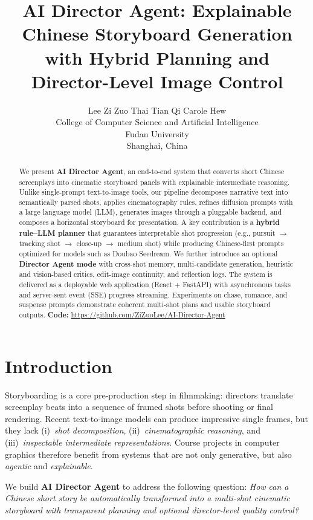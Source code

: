 \documentclass{article}
\title{AI Director Agent: Explainable Chinese Storyboard Generation\\[0.25em] with Hybrid Planning and Director-Level Image Control}
\author{Lee Zi Zuo \And Thai Tian Qi \And Carole Hew \\
College of Computer Science and Artificial Intelligence \\
Fudan University \\
Shanghai, China
}
\begin{document}
\maketitle

\begin{abstract}
We present \textbf{AI Director Agent}, an end-to-end system that converts short Chinese screenplays into cinematic storyboard panels with explainable intermediate reasoning.
Unlike single-prompt text-to-image tools, our pipeline decomposes narrative text into semantically parsed shots, applies cinematography rules, refines diffusion prompts with a large language model (LLM), generates images through a pluggable backend, and composes a horizontal storyboard for presentation.
A key contribution is a \textbf{hybrid rule--LLM planner} that guarantees interpretable shot progression (e.g., pursuit $\rightarrow$ tracking shot $\rightarrow$ close-up $\rightarrow$ medium shot) while producing Chinese-first prompts optimized for models such as Doubao Seedream.
We further introduce an optional \textbf{Director Agent mode} with cross-shot memory, multi-candidate generation, heuristic and vision-based critics, edit-image continuity, and reflection logs.
The system is delivered as a deployable web application (React + FastAPI) with asynchronous tasks and server-sent event (SSE) progress streaming.
Experiments on chase, romance, and suspense prompts demonstrate coherent multi-shot plans and usable storyboard outputs.
\textbf{Code:} \url{https://github.com/ZiZuoLee/AI-Director-Agent}
\end{abstract}

\section{Introduction}
\label{sec:intro}

Storyboarding is a core pre-production step in filmmaking: directors translate screenplay beats into a sequence of framed shots before shooting or final rendering.
Recent text-to-image models can produce impressive single frames, but they lack (i)~\textit{shot decomposition}, (ii)~\textit{cinematographic reasoning}, and (iii)~\textit{inspectable intermediate representations}.
Course projects in computer graphics therefore benefit from systems that are not only generative, but also \textit{agentic} and \textit{explainable}.

We build \textbf{AI Director Agent} to address the following question:
\emph{How can a Chinese short story be automatically transformed into a multi-shot cinematic storyboard with transparent planning and optional director-level quality control?}
\end{document}

